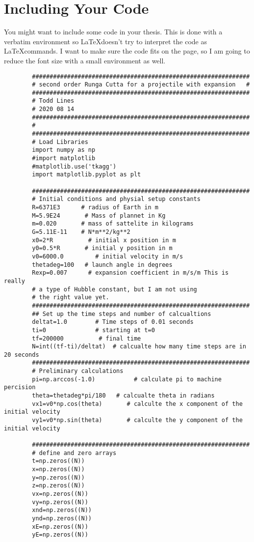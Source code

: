 \chapter{Including Your Code}
\label{app:Talk}

You might want to include some code in your thesis. This is done with a verbatim environment so \LaTeX \enspace doesn't try to interpret the code as \LaTeX \enspace commands. I want to make sure the code fits on the page, so I am going to reduce the font size with a small environment as well. 
\begin{small}

	
	\begin{verbatim}
		##############################################################
		# second order Runga Cutta for a projectile with expansion   #
		##############################################################
		# Todd Lines
		# 2020 08 14
		##############################################################
		# 
		##############################################################
		# Load Libraries
		import numpy as np
		#import matplotlib
		#matplotlib.use('tkagg')
		import matplotlib.pyplot as plt
		
		##############################################################
		# Initial conditions and physial setup constants
		R=6371E3      # radius of Earth in m
		M=5.9E24       # Mass of plannet in Kg
		m=0.020       # mass of sattelite in kilograms
		G=5.11E-11    # N*m**2/kg**2
		x0=2*R          # initial x position in m
		y0=0.5*R       # initial y position in m
		v0=6000.0         # initial velocity in m/s
		thetadeg=100   # launch angle in degrees
		Rexp=0.007      # expansion coefficient in m/s/m This is really 
		# a type of Hubble constant, but I am not using
		# the right value yet.
		##############################################################
		## Set up the time steps and number of calcualtions
		deltat=1.0        # Time steps of 0.01 seconds
		ti=0              # starting at t=0
		tf=200000          # final time
		N=int((tf-ti)/deltat)  # calcualte how many time steps are in 20 seconds
		##############################################################
		# Preliminary calculations
		pi=np.arccos(-1.0)           # calculate pi to machine percision
		theta=thetadeg*pi/180   # calcualte theta in radians
		vx1=v0*np.cos(theta)       # calculte the x component of the initial velocity
		vy1=v0*np.sin(theta)       # calculte the y component of the initial velocity
		
		##############################################################
		# define and zero arrays
		t=np.zeros((N))
		x=np.zeros((N))
		y=np.zeros((N))
		z=np.zeros((N))
		vx=np.zeros((N))
		vy=np.zeros((N))
		xnd=np.zeros((N))
		ynd=np.zeros((N))
		xE=np.zeros((N))
		yE=np.zeros((N))
		

\end{verbatim}
\end{small}
